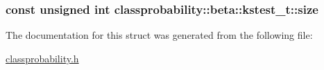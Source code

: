 \subsubsection[{\texorpdfstring{size}{size}}]{\setlength{\rightskip}{0pt plus 5cm}const unsigned int classprobability\+::beta\+::kstest\+\_\+t\+::size}\hypertarget{structclassprobability_1_1beta_1_1kstest__t_afa18f1aa40ee1b9d585e38582f4f05b7}{}\label{structclassprobability_1_1beta_1_1kstest__t_afa18f1aa40ee1b9d585e38582f4f05b7}


The documentation for this struct was generated from the following file\+:\begin{DoxyCompactItemize}
\item 
\hyperlink{classprobability_8h}{classprobability.\+h}\end{DoxyCompactItemize}

